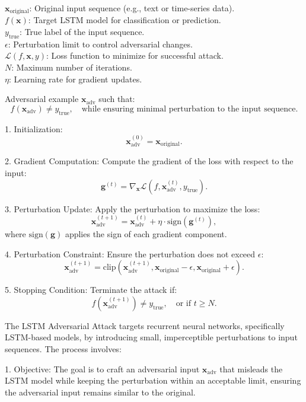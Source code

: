 $\mathbf{x}_{\text{original}}$: Original input sequence (e.g., text or time-series data). \\
$f(\mathbf{x})$: Target LSTM model for classification or prediction. \\
$y_{\text{true}}$: True label of the input sequence. \\
$\epsilon$: Perturbation limit to control adversarial changes. \\
$\mathcal{L}(f, \mathbf{x}, y)$: Loss function to minimize for successful attack. \\
$N$: Maximum number of iterations. \\
$\eta$: Learning rate for gradient updates.

Adversarial example $\mathbf{x}_{\text{adv}}$ such that:
\[
f(\mathbf{x}_{\text{adv}}) \neq y_{\text{true}}, \quad \text{while ensuring minimal perturbation to the input sequence}.
\]

1. Initialization:
   \[
   \mathbf{x}_{\text{adv}}^{(0)} = \mathbf{x}_{\text{original}}.
   \]

2. Gradient Computation:
   Compute the gradient of the loss with respect to the input:
   \[
   \mathbf{g}^{(t)} = \nabla_{\mathbf{x}} \mathcal{L}(f, \mathbf{x}_{\text{adv}}^{(t)}, y_{\text{true}}).
   \]

3. Perturbation Update:
   Apply the perturbation to maximize the loss:
   \[
   \mathbf{x}_{\text{adv}}^{(t+1)} = \mathbf{x}_{\text{adv}}^{(t)} + \eta \cdot \text{sign}(\mathbf{g}^{(t)}),
   \]
   where $\text{sign}(\mathbf{g})$ applies the sign of each gradient component.

4. Perturbation Constraint:
   Ensure the perturbation does not exceed $\epsilon$:
   \[
   \mathbf{x}_{\text{adv}}^{(t+1)} = \text{clip}(\mathbf{x}_{\text{adv}}^{(t+1)}, \mathbf{x}_{\text{original}} - \epsilon, \mathbf{x}_{\text{original}} + \epsilon).
   \]

5. Stopping Condition:
   Terminate the attack if:
   \[
   f(\mathbf{x}_{\text{adv}}^{(t+1)}) \neq y_{\text{true}}, \quad \text{or if } t \geq N.
   \]

The LSTM Adversarial Attack targets recurrent neural networks, specifically LSTM-based models, by introducing small, imperceptible perturbations to input sequences. The process involves:

1. Objective: The goal is to craft an adversarial input $\mathbf{x}_{\text{adv}}$ that misleads the LSTM model while keeping the perturbation within an acceptable limit, ensuring the adversarial input remains similar to the original.

